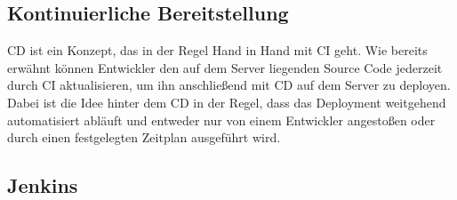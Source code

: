 \subsection*{Kontinuierliche Bereitstellung}

\ac{CD} ist ein Konzept, das in der Regel Hand in Hand mit \ac{CI} geht. Wie bereits erwähnt können Entwickler den auf dem Server liegenden Source Code jederzeit durch \ac{CI} aktualisieren, um ihn anschließend mit \ac{CD} auf dem Server zu deployen. Dabei ist die Idee hinter dem \ac{CD} in der Regel, dass das Deployment weitgehend automatisiert abläuft und entweder nur von einem Entwickler angestoßen oder durch einen festgelegten Zeitplan ausgeführt wird.

\subsection*{Jenkins}

